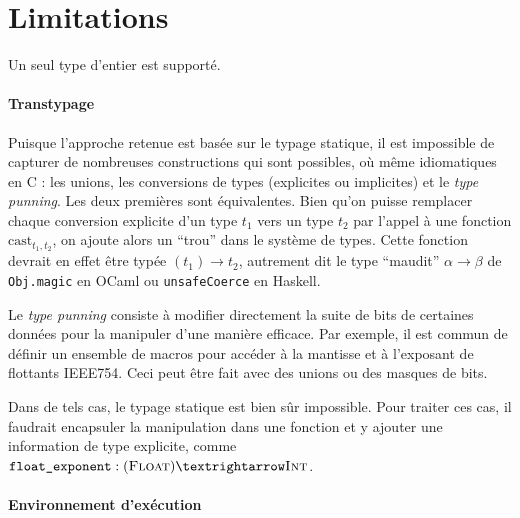 


\section{Limitations}

Un seul type d'entier est supporté.



\paragraph{Transtypage}

Puisque l'approche retenue est basée sur le typage statique, il est impossible
de capturer de nombreuses constructions qui sont possibles, où même idiomatiques
en C : les unions, les conversions de types (explicites ou implicites) et le
\emph{type punning}. Les deux premières sont équivalentes. Bien qu'on puisse
remplacer chaque conversion explicite d'un type $t_1$ vers un type $t_2$ par
l'appel à une fonction $\mathrm{cast}_{t_1,t_2}$, on ajoute alors un ``trou''
dans le système de types. Cette fonction devrait en effet être typée $(t_1) →
t_2$, autrement dit le type ``maudit'' $α → β$ de \texttt{Obj.magic} en OCaml ou
\texttt{unsafeCoerce} en Haskell.


Le \emph{type punning} consiste à modifier directement la suite de bits de
certaines données pour la manipuler d'une manière efficace. Par exemple, il est
commun de définir un ensemble de macros pour accéder à la mantisse et à
l'exposant de flottants IEEE754. Ceci peut être fait avec des unions ou des
masques de bits.

Dans de tels cas, le typage statique est bien sûr impossible. Pour traiter ces
cas, il faudrait encapsuler la manipulation dans une fonction et y ajouter une
information de type explicite, comme $\texttt{float\_exponent} : (\tFloat) →
\tInt$.

\paragraph{Environnement d'exécution}

